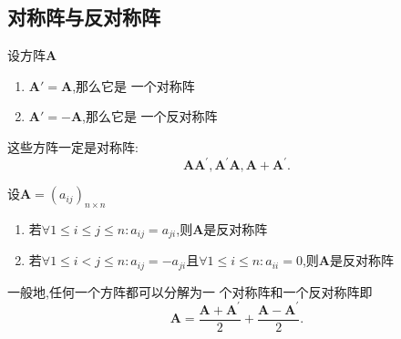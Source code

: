 \subsection{对称阵与反对称阵}
\begin{formal}
\begin{definition}[对称阵与反对称阵]\label{def:对称阵与反对称阵}
设方阵$\bm{A}$\begin{enumerate}[label=\textup{(\arabic*)}]
\item $ \bm{A}'= \bm{A}$,那么它是
一个对称阵
\item $ \bm{A}'= -\bm{A}$,那么它是
一个反对称阵
\end{enumerate}
\end{definition}
\end{formal}
\vfill
\begin{red}\begin{remark}
这些方阵一定是对称阵:\[
    \bm{A}\bm{A}^{\prime},\bm{A}^{\prime}\bm{A},\bm{A}+\bm{A}^{\prime}.
\]
\end{remark}
\end{red}
\begin{formal}
    \begin{definition}[对称与反对称等价定义]\label{def:对称与反对称等价定义}设$\bm{A}=\left(a_{ij}\right)_{n\times n}$\begin{enumerate}[label=\textup{(\arabic*)}]
        \item         若$\forall1\leqslant i\leqslant j\leqslant n:a_{ij}=a_{ji}$,则$\bm{A}$是反对称阵
        \item        若$\forall1\leqslant i<j\leqslant n:a_{ij}=-a_{ji}$且$\forall1\leqslant i\leqslant n:a_{ii}=0$,则$\bm{A}$是反对称阵
    \end{enumerate}
    \end{definition}
\end{formal}
\begin{formal}
\begin{theorem}[矩阵拆分]\label{thm:矩阵拆分}
    一般地,任何一个方阵都可以分解为一
    个对称阵和一个反对称阵即
\[
    \bm{A} = \dfrac{\bm{A}+\bm{A}^{\prime}}{2}  + \dfrac{\bm{A}
    -\bm{A}^{\prime}}{2}.
\]
\end{theorem}
\end{formal}
